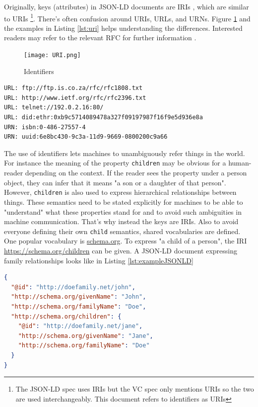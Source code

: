 Originally, keys (attributes) in \acrshort{JSON-LD} documents are \acrfull{IRI}s \parencite{rfc3987}, which are similar to \acrfull{URI}s \parencite{rfc3986}
\footnote{The \acrshort{JSON-LD} spec uses \acrshort{IRI}s but the \acrshort{VC} spec only mentions \acrshort{URI}s so the two are used interchangeably. This document refers to identifiers as \acrshort{URI}s}. 
There's often confusion around \acrshort{URI}s, \acrshort{URL}s, and \acrshort{URN}s. Figure \ref{fig:uri} and the examples in Listing \ref{lst:uri} helps understanding the differences. Interested readers may refer to the relevant \acrshort{RFC} for further information \parencite{rfc3305}.

\begin{figure}[htbp]
  \centering
  \texttt{[image: URI.png]}
  \caption{Identifiers}
  \label{fig:uri}
\end{figure}

\begin{lstlisting}[label={lst:uri}, caption={URL and URN examples}]
URL: ftp://ftp.is.co.za/rfc/rfc1808.txt
URL: http://www.ietf.org/rfc/rfc2396.txt
URL: telnet://192.0.2.16:80/
URL: did:ethr:0xb9c5714089478a327f09197987f16f9e5d936e8a
URN: isbn:0-486-27557-4
URN: uuid:6e8bc430-9c3a-11d9-9669-0800200c9a66
\end{lstlisting}


The use of identifiers lets machines to unambiguously refer things in the world. For instance the meaning of the property \lstinline{children} may be obvious for a human-reader depending on the context. If the reader sees the property under a person object, they can infer that it means "a son or a daughter of that person". However, \lstinline{children} is also used to express hierarchical relationships between things. These semantics need to be stated explicitly for machines to be able to "understand" what these properties stand for and to avoid such ambiguities in machine communication. That's why instead the keys are \acrlong{IRI}s. Also to avoid everyone defining their own \lstinline{child} semantics, shared vocabularies are defined. One popular vocabulary is \url{schema.org}. To express "a child of a person", the \acrshort{IRI} \url{https://schema.org/children} can be given. A \acrshort{JSON-LD} document expressing family relationships looks like in Listing \ref{lst:exampleJSONLD}

\begin{lstlisting}[language=json, label={lst:exampleJSONLD}, caption={A JSON-LD with full \acrshort{IRI}s}]
{
  "@id": "http://doefamily.net/john",
  "http://schema.org/givenName": "John",
  "http://schema.org/familyName": "Doe",
  "http://schema.org/children": {
    "@id": "http://doefamily.net/jane",
    "http://schema.org/givenName": "Jane",
    "http://schema.org/familyName": "Doe"
  }
}
\end{lstlisting}

